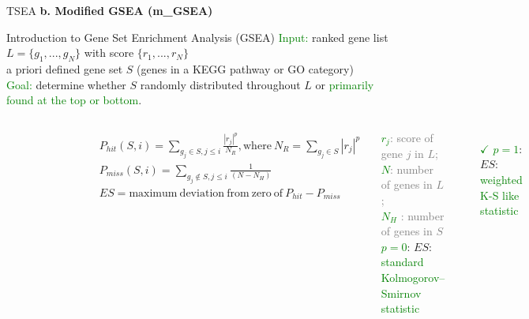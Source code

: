 \documentclass[10pt]{beamer}
\begin{document}
\begin{frame}{TSEA}
\alert{\textbf{b. Modified GSEA (m\_GSEA)}}
\small
\begin{exampleblock}{Introduction to Gene Set Enrichment Analysis (GSEA)}
    \textcolor{green}{Input:} ranked gene list $L = \{g_1,...,g_N\}$ with score $\{r_1,...,r_N\}$ \\
     a priori defined gene set $S$ (genes in a KEGG pathway or GO category) \\
    \textcolor{green}{Goal:} determine whether $S$ randomly distributed throughout $L$ or \textcolor{green}{primarily found at the top or bottom}. \\
\end{exampleblock}
\vspace{-0.1cm}
\begin{columns}
        \begin{figure}
            \centering
            \includegraphics[width=4.8cm]{demo/images/gsea.png}
            \label{fig:gsea}
        \end{figure}
        \scriptsize{\textcolor{gray}{\cite{Subramanian2005-ro}}}
        \renewcommand*{\normalfont}{\relax}
        \scriptsize
        \begin{align}
        &\scriptstyle P_{hit}(S,i)=\sum_{g_j\in S, j\leq i}\frac{|r_j|^p}{N_R}, \mathrm{where}\ N_R=\sum_{g_j\in S} {|r_j|^p} 
        \label{eq:nr}\\
        &\scriptstyle P_{miss}(S,i)=\sum_{g_j\notin S, j\leq i}\frac{1}{(N-N_H)} \\
        &\scriptstyle ES = \mathrm{maximum\  deviation\  from\  zero\  of\  } P_{hit} - P_{miss}
        \end{align}
      
      \hspace{1cm}\scriptsize{\textcolor{green}{$r_j$}\textcolor{gray}{: score of gene $j$ in $L$;} \textcolor{green}{$N$}\textcolor{gray}{: number of genes in $L$;} \\ 
      \hspace{1cm}\textcolor{green}{$N_H$} \textcolor{gray}{: number of genes in $S$}} \\
      \vspace{0.2cm}
      \footnotesize
      \hspace{0.65cm}\textcolor{green}{$p=0$}: $ES$: \textcolor{green}{standard Kolmogorov–Smirnov statistic} \\
      \begin{itemize} \itemsep0pt
          \item[\textcolor{green}{$\checkmark$}]  \textcolor{green}{$p=1$}: $ES$: \textcolor{green}{weighted K-S like statistic}
      \end{itemize}
      

\end{columns}
\end{frame}
\end{document}
